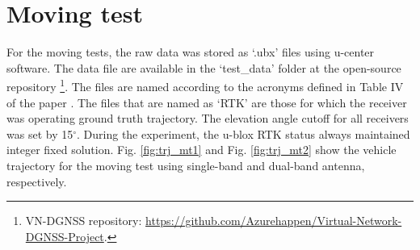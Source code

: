 \documentclass[letterpaper, 10 pt,onecolumn]{article}
\begin{document}
	\section{Moving test}
	For the moving tests, the raw data was stored as `.ubx' files using u-center software. The data file are available in the `test\_data' folder at the open-source repository \footnote{VN-DGNSS repository: \url{https://github.com/Azurehappen/Virtual-Network-DGNSS-Project}.}. The files are named according to the acronyms defined in Table IV of the paper \cite{hu2021using}. The files that are named as `RTK' are those for which the receiver was operating ground truth trajectory. The elevation angle cutoff for all receivers was set by 15$^\circ$. During the experiment, the u-blox RTK status always maintained integer fixed solution.
	Fig. \ref{fig:trj_mt1} and Fig. \ref{fig:trj_mt2} show the vehicle trajectory for the moving test using single-band and dual-band antenna, respectively.
\end{document}
